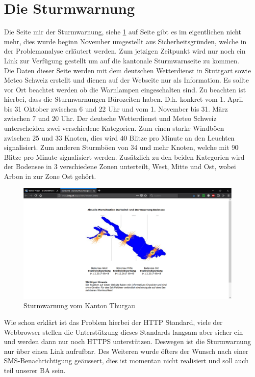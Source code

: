 \section{Die Sturmwarnung}

Die Seite mir der Sturmwarnung, siehe \ref{img:Sturmwarnung} auf Seite \pageref{img:Sturmwarnung} gibt es im eigentlichen nicht mehr, dies wurde beginn November umgestellt aus Sicherheitsgründen, welche in der Problemanalyse erläutert werden. Zum jetzigen Zeitpunkt wird nur noch ein Link zur Verfügung gestellt um auf die kantonale Sturmwarnseite zu kommen. Die Daten dieser Seite werden mit dem deutschen Wetterdienst in Stuttgart sowie Meteo Schweiz erstellt und dienen auf der Webseite nur als Information. Es sollte vor Ort beachtet werden ob die Warnlampen eingeschalten sind. Zu beachten ist hierbei, dass die Sturmwarnungen Bürozeiten haben. D.h. konkret vom 1. April bis 31 Oktober zwischen 6 und 22 Uhr und vom 1. November bis 31. März zwischen 7 und 20 Uhr. Der deutsche Wetterdienst und Meteo Schweiz unterscheiden zwei verschiedene Kategorien. Zum einen starke Windböen zwischen 25 und 33 Knoten, dies wird 40 Blitze pro Minute an den Leuchten signalisiert. Zum anderen Sturmböen von 34 und mehr Knoten, welche mit 90 Blitze pro Minute signalisiert werden. Zusätzlich zu den beiden Kategorien wird der Bodensee in 3 verschiedene Zonen unterteilt, West, Mitte und Ost, wobei Arbon in zur Zone Ost gehört. 
\begin{figure}[htbp]
	\centering
	\includegraphics[width=0.9\linewidth]{img/sturmwarnung}
	\caption{Sturmwarnung vom Kanton Thurgau}
	\label{img:Sturmwarnung}
\end{figure}

Wie schon erklärt ist das Problem hierbei der HTTP Standard, viele der Webbrowser stellen die Unterstützung dieses Standards langsam aber sicher ein und werden dann nur noch HTTPS unterstützen\cite{Mozilla:DeprecatingNon-SecureHTTP}. Deswegen ist die Sturmwarnung nur über einen Link aufrufbar. Des Weiteren wurde öfters der Wunsch nach einer SMS-Benachrichtigung geäussert, dies ist momentan nicht realisiert und soll auch teil unserer BA sein. 

